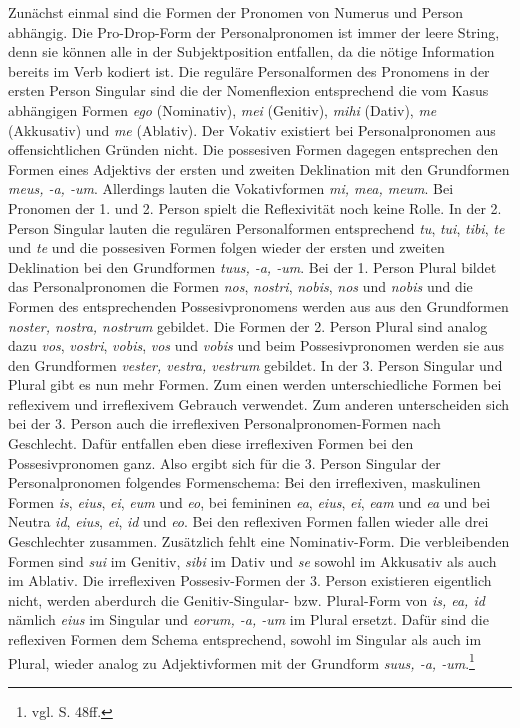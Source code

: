 \documentclass[fontsize=12pt,abstract=on,titlepage,bibliography=totoc,ngerman,listof=totoc]{scrreprt}
\begin{document}
Zunächst einmal sind die Formen der Pronomen von Numerus und Person abhängig. Die Pro-Drop-Form der Personalpronomen ist immer der leere String, denn sie können alle in der Subjektposition entfallen, da die nötige Information bereits im Verb kodiert ist. Die reguläre Personalformen des Pronomens in der ersten Person Singular sind die der Nomenflexion entsprechend die vom Kasus abhängigen Formen \textit{ego} (Nominativ), \textit{mei} (Genitiv), \textit{mihi} (Dativ), \textit{me} (Akkusativ) und \textit{me} (Ablativ). Der Vokativ existiert bei Personalpronomen aus offensichtlichen Gründen nicht. Die possesiven Formen dagegen entsprechen den Formen eines Adjektivs der ersten und zweiten Deklination mit den Grundformen \textit{meus, -a, -um}. Allerdings lauten die Vokativformen \textit{mi, mea, meum}. Bei Pronomen der 1. und 2. Person spielt die Reflexivität noch keine Rolle. In der 2. Person Singular lauten die regulären Personalformen entsprechend \textit{tu}, \textit{tui}, \textit{tibi}, \textit{te} und \textit{te} und die possesiven Formen folgen wieder der ersten und zweiten Deklination bei den Grundformen \textit{tuus, -a, -um}. Bei der 1. Person Plural bildet das Personalpronomen die Formen \textit{nos}, \textit{nostri}, \textit{nobis}, \textit{nos} und \textit{nobis} und die Formen des entsprechenden Possesivpronomens werden aus aus den Grundformen \textit{noster, nostra, nostrum} gebildet. Die Formen der 2. Person Plural sind analog dazu \textit{vos}, \textit{vostri}, \textit{vobis}, \textit{vos} und \textit{vobis} und beim Possesivpronomen werden sie aus den Grundformen \textit{vester, vestra, vestrum} gebildet. In der 3. Person Singular und Plural gibt es nun mehr Formen. Zum einen werden unterschiedliche Formen bei reflexivem und irreflexivem Gebrauch verwendet. Zum anderen unterscheiden sich bei der 3. Person auch die irreflexiven Personalpronomen-Formen nach Geschlecht. Dafür entfallen eben diese irreflexiven Formen bei den Possesivpronomen ganz. Also ergibt sich für die 3. Person Singular der Personalpronomen folgendes Formenschema: Bei den irreflexiven, maskulinen Formen \textit{is}, \textit{eius}, \textit{ei}, \textit{eum} und \textit{eo}, bei femininen \textit{ea}, \textit{eius}, \textit{ei}, \textit{eam} und \textit{ea} und bei Neutra \textit{id}, \textit{eius}, \textit{ei}, \textit{id} und \textit{eo}. Bei den reflexiven Formen fallen wieder alle drei Geschlechter zusammen. Zusätzlich fehlt eine Nominativ-Form. Die verbleibenden Formen sind \textit{sui} im Genitiv, \textit{sibi} im Dativ und \textit{se} sowohl im Akkusativ als auch im Ablativ. Die irreflexiven Possesiv-Formen der 3. Person existieren eigentlich nicht, werden aberdurch die Genitiv-Singular- bzw. Plural-Form von \textit{is, ea, id} nämlich \textit{eius} im Singular und \textit{eorum, -a, -um} im Plural ersetzt. Dafür sind die reflexiven Formen dem Schema entsprechend, sowohl im Singular als auch im Plural, wieder analog zu Adjektivformen mit der Grundform \textit{suus, -a, -um}.\footnote{vgl. \cite{BAYER-LINDAUER1994} S. 48ff.} \par
\end{document}
